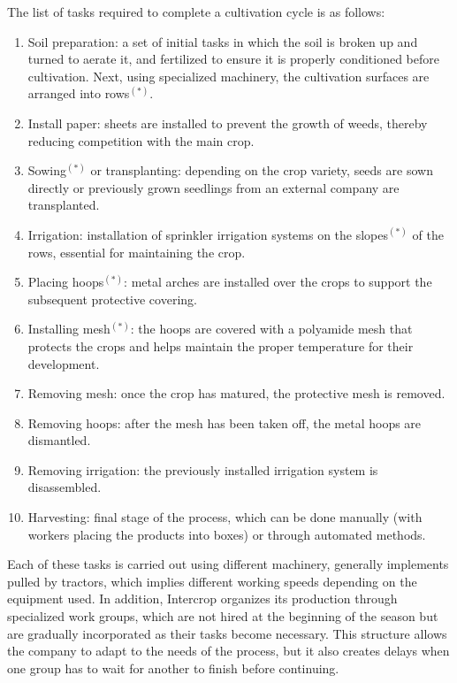 The list of tasks required to complete a cultivation cycle is as follows:
\begin{enumerate}
    \item Soil preparation: a set of initial tasks in which the soil is broken up and turned to aerate it, and fertilized to ensure it is properly conditioned before cultivation.  
Next, using specialized machinery, the cultivation surfaces are arranged into \gls{row}s$^{(*)}$.

\item Install paper: sheets are installed to prevent the growth of weeds, thereby reducing competition with the main crop.

\item \gls{Sowing}$^{(*)}$ or transplanting: depending on the crop variety, seeds are sown directly or previously grown seedlings from an external company are transplanted.

\item Irrigation: installation of sprinkler irrigation systems on the \gls{slope}s$^{(*)}$ of the rows, essential for maintaining the crop.

\item Placing \gls{hoops}$^{(*)}$: metal arches are installed over the crops to support the subsequent protective covering.

\item Installing \gls{mesh}$^{(*)}$: the hoops are covered with a polyamide mesh that protects the crops and helps maintain the proper temperature for their development.

\item Removing mesh: once the crop has matured, the protective mesh is removed.

\item Removing hoops: after the mesh has been taken off, the metal hoops are dismantled.

\item Removing irrigation: the previously installed irrigation system is disassembled.

\item Harvesting: final stage of the process, which can be done manually (with workers placing the products into boxes) or through automated methods.

\end{enumerate}

Each of these tasks is carried out using different machinery, generally implements pulled by tractors, which implies different working speeds depending on the equipment used.  
In addition, Intercrop organizes its production through specialized work groups, which are not hired at the beginning of the season but are gradually incorporated as their tasks become necessary.  
This structure allows the company to adapt to the needs of the process, but it also creates delays when one group has to wait for another to finish before continuing.

